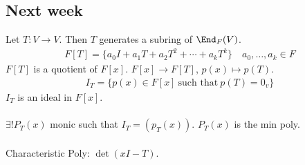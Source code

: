 \documentclass[class=scrartcl, crop=false]{standalone}
\begin{document}
\subsection{Next week}

Let $T: V \to V$. Then $T$ generates a subring of $\End_F(V)$. 
\begin{gather*}
  F[T] = \{a_0 I + a_1 T + a_2 T^2 + \cdots + a_kT^k\} \quad a_0, \dots, a_k \in F
\end{gather*} 
$F[T]$ is a quotient of $F[x]$. $F[x] \to F[T]$, $p(x) \mapsto p(T)$.
\begin{gather*}
  I_T = \{p(x) \in F[x] \ \text{such that} \ p(T) = 0_v\}
\end{gather*} 
$I_T$ is an ideal in $F[x]$. %
\\\\
$\exists ! P_T(x)$ monic such that $I_T = (p_T(x))$. $P_T(x)$ is the min poly.
\\\\
Characteristic Poly: $\det(xI - T)$.
\end{document}
